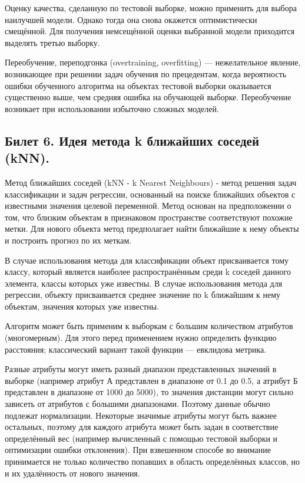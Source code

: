 \documentclass[a4paper, 12pt]{article}
\begin{document}
	Оценку качества, сделанную по тестовой выборке, можно применить для выбора наилучшей модели. Однако тогда она снова окажется оптимистически смещённой. Для получения немсещённой оценки выбранной модели приходится выделять третью выборку.
	
	Переобучение, переподгонка (overtraining, overfitting) — нежелательное явление, возникающее при решении задач обучения по прецедентам, когда вероятность ошибки обученного алгоритма на объектах тестовой выборки оказывается существенно выше, чем средняя ошибка на обучающей выборке. Переобучение возникает при использовании избыточно сложных моделей.
	
	\subsection*{Билет 6. Идея метода k ближайших соседей (kNN).}
	Метод ближайших соседей (kNN - k Nearest Neighbours) - метод решения задач классификации и задач регрессии, основанный на поиске ближайших объектов с известными значения целевой переменной. Метод основан на предположении о том, что близким объектам в признаковом пространстве соответствуют похожие метки.
	Для нового объекта метод предполагает найти ближайшие к нему объекты и построить прогноз по их меткам.
	
	В случае использования метода для классификации объект присваивается тому классу, который является наиболее распространённым среди k соседей данного элемента, классы которых уже известны. В случае использования метода для регрессии, объекту присваивается среднее значение по k ближайшим к нему объектам, значения которых уже известны.
	
	Алгоритм может быть применим к выборкам с большим количеством атрибутов (многомерным). Для этого перед применением нужно определить функцию расстояния; классический вариант такой функции — евклидова метрика.
	
	Разные атрибуты могут иметь разный диапазон представленных значений в выборке (например атрибут А представлен в диапазоне от 0.1 до 0.5, а атрибут Б представлен в диапазоне от 1000 до 5000), то значения дистанции могут сильно зависеть от атрибутов с большими диапазонами. Поэтому данные обычно подлежат нормализации. Некоторые значимые атрибуты могут быть важнее остальных, поэтому для каждого атрибута может быть задан в соответствие определённый вес (например вычисленный с помощью тестовой выборки и оптимизации ошибки отклонения). При взвешенном способе во внимание принимается не только количество попавших в область определённых классов, но и их удалённость от нового значения.
	
\end{document}
